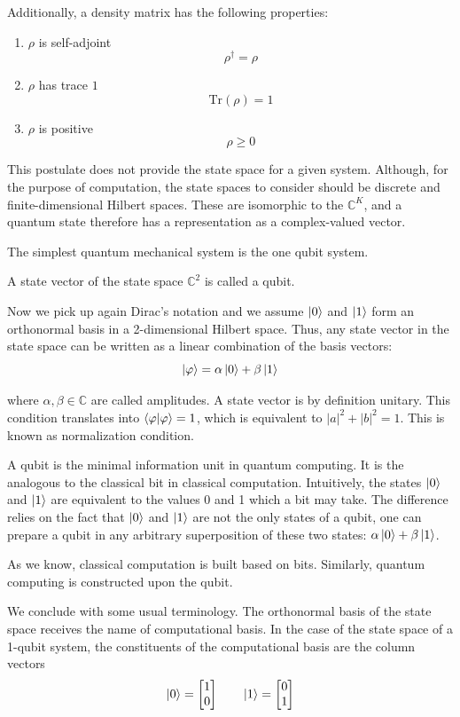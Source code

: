 Additionally, a density matrix has the following properties:
\begin{enumerate}
    \item $\rho$ is self-adjoint $$\rho^{\dag}=\rho$$
    \item $\rho$ has trace $1$ $$\mathrm{Tr}(\rho) = 1$$
    \item $\rho$ is positive $$\rho \geq 0$$
    
\end{enumerate}


This postulate does not provide the state space for a given system. Although, for the purpose of computation, the state spaces to consider should be discrete and finite-dimensional Hilbert spaces. These are isomorphic to the $\mathbb{C}^K$, and a quantum state therefore has a representation as a complex-valued vector.

The simplest quantum mechanical system is the one qubit system.

\begin{definicion}[Qubit]
    A state vector of the state space $\mathbb{C}^2$ is called a qubit.
\end{definicion}

Now we pick up again Dirac's notation and we assume $\ket{0}$ and $\ket{1}$ form an orthonormal basis in a 2-dimensional Hilbert space. Thus, any state vector in the state space can be written as a linear combination of the basis vectors:
$$\ket{\varphi} = \alpha \ket{0} + \beta \ket{1}$$

where $\alpha, \beta \in \mathbb{C} $ are called amplitudes. A state vector is by definition unitary. This condition translates into $\braket{\varphi | \varphi} = 1$, which is equivalent to $|a|^2 + |b|^2 = 1$. This is known as normalization condition. 

A qubit is the minimal information unit in quantum computing. It is the analogous to the classical bit in classical computation. Intuitively, the states $\ket{0}$ and $\ket{1}$ are equivalent to the values 0 and 1 which a bit may take. The difference relies on the fact that $\ket{0}$ and $\ket{1}$ are not the only states of a qubit, one can prepare a qubit in any arbitrary superposition of these two states: $\alpha \ket{0} + \beta \ket{1}$. 

As we know, classical computation is built based on bits. Similarly, quantum computing is constructed upon the qubit. 

We conclude with some usual terminology. The orthonormal basis of the state space receives the name of computational basis. In the case of the state space of a 1-qubit system, the constituents of the computational basis are the column vectors
\begin{equation}
    \ket{0} =
    \begin{bmatrix}
    1\\
    0\\
    \end{bmatrix}
    \quad \quad
    \ket{1} =
    \begin{bmatrix}
    0\\
    1\\
    \end{bmatrix}  
\end{equation}

